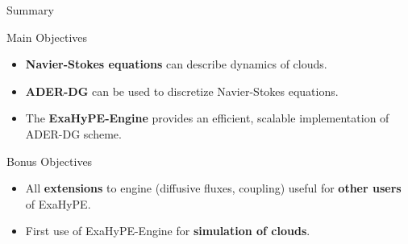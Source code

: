 \documentclass{beamer}
\begin{document}
\begin{frame}{Summary}
  \begin{block}{Main Objectives}
  \begin{itemize}
  \item \textbf{Navier-Stokes equations} can describe dynamics of clouds.
  \item \textbf{ADER-DG} can be used to discretize Navier-Stokes equations.
  \item The \textbf{ExaHyPE-Engine} provides an efficient, scalable implementation of ADER-DG scheme. 
  \end{itemize}
  \end{block}

  \begin{block}{Bonus Objectives}
    \begin{itemize}
    \item All \textbf{extensions} to engine (diffusive fluxes, coupling) useful for \textbf{other users} of ExaHyPE.
    \item First use of ExaHyPE-Engine for \textbf{simulation of clouds}.
    \end{itemize}

  \end{block}
\end{frame}
\end{document}
